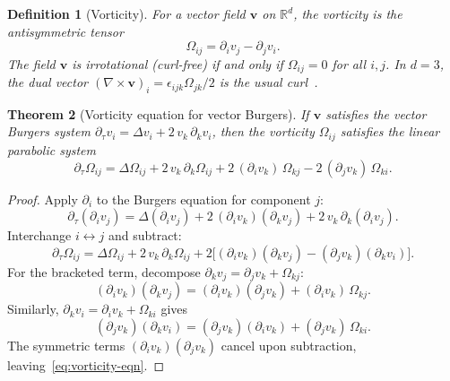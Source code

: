 \documentclass[11pt]{article}
\newtheorem{theorem}{Theorem}[section]
\newtheorem{definition}[theorem]{Definition}
\newcommand{\R}{\mathbb{R}}
\begin{document}
\begin{definition}[Vorticity]\label{def:vorticity}
For a vector field $\bm{v}$ on $\R^d$, the \emph{vorticity} is the antisymmetric tensor
\begin{equation}\label{eq:vorticity-def}
  \Omega_{ij} = \partial_i v_j - \partial_j v_i.
\end{equation}
The field $\bm{v}$ is irrotational (curl-free) if and only if $\Omega_{ij} = 0$ for all $i,j$.
In $d = 3$, the dual vector $(\nabla \times \bm{v})_i = \epsilon_{ijk}\Omega_{jk}/2$ is the usual curl~\citep{bhatia2013helmholtz}.
\end{definition}

\begin{theorem}[Vorticity equation for vector Burgers]\label{thm:vorticity}
If $\bm{v}$ satisfies the vector Burgers system $\partial_\tau v_i = \Delta v_i + 2\,v_k\,\partial_k v_i$, then the vorticity $\Omega_{ij}$ satisfies the linear parabolic system
\begin{equation}\label{eq:vorticity-eqn}
  \partial_\tau \Omega_{ij}
  = \Delta \Omega_{ij}
    + 2\,v_k\,\partial_k \Omega_{ij}
    + 2\,(\partial_i v_k)\,\Omega_{kj}
    - 2\,(\partial_j v_k)\,\Omega_{ki}.
\end{equation}
\end{theorem}

\begin{proof}
Apply $\partial_i$ to the Burgers equation for component $j$:
\begin{equation}\label{eq:diff-j}
  \partial_\tau(\partial_i v_j) = \Delta(\partial_i v_j) + 2\,(\partial_i v_k)(\partial_k v_j) + 2\,v_k\,\partial_k(\partial_i v_j).
\end{equation}
Interchange $i \leftrightarrow j$ and subtract:
\begin{equation}\label{eq:diff-ij}
  \partial_\tau \Omega_{ij}
  = \Delta \Omega_{ij}
    + 2\,v_k\,\partial_k \Omega_{ij}
    + 2\bigl[(\partial_i v_k)(\partial_k v_j) - (\partial_j v_k)(\partial_k v_i)\bigr].
\end{equation}
For the bracketed term, decompose $\partial_k v_j = \partial_j v_k + \Omega_{kj}$:
\[
  (\partial_i v_k)(\partial_k v_j)
  = (\partial_i v_k)(\partial_j v_k) + (\partial_i v_k)\,\Omega_{kj}.
\]
Similarly, $\partial_k v_i = \partial_i v_k + \Omega_{ki}$ gives
\[
  (\partial_j v_k)(\partial_k v_i)
  = (\partial_j v_k)(\partial_i v_k) + (\partial_j v_k)\,\Omega_{ki}.
\]
The symmetric terms $(\partial_i v_k)(\partial_j v_k)$ cancel upon subtraction, leaving~\eqref{eq:vorticity-eqn}.
\end{proof}
\end{document}
